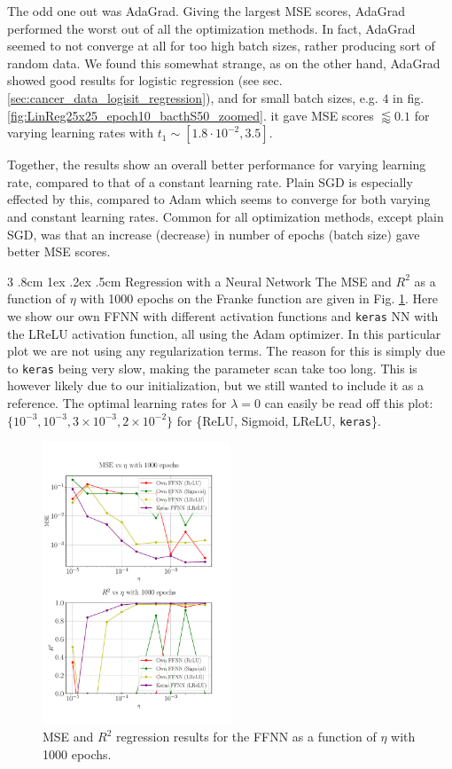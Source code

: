 \documentclass[%
reprint,s
amsmath,amssymb,
aps,
]{revtex4-2}
\makeatletter
\renewcommand{\subsubsection}{%
	\@startsection
	{subsubsection}%
	{3}%
	{\z@}%
	{.8cm \@plus1ex \@minus .2ex}%
	{.5cm}%
	{\normalfont\small\centering}%
}
\makeatother
\begin{document}
The odd one out was AdaGrad. Giving the largest MSE scores, AdaGrad performed the worst out of all the optimization methods. In fact, AdaGrad seemed to not converge at all for too high batch sizes, rather producing sort of random data. We found this somewhat strange, as on the other hand, AdaGrad showed good results for logistic regression (see sec. \ref{sec:cancer_data_logisit_regression}), and for small batch sizes, e.g. \(4\) in fig. \ref{fig:LinReg25x25_epoch10_bacthS50_zoomed}. it gave MSE scores \(\lessapprox 0.1\) for varying learning rates with \(t_1\sim[1.8\cdot 10^{-2}, 3.5]\).

Together, the results show an overall better performance for varying learning rate, compared to that of a constant learning rate. Plain SGD is especially effected by this, compared to Adam which seems to converge for both varying and constant learning rates. Common for all optimization methods, except plain SGD, was that an increase (decrease) in number of epochs (batch size) gave better MSE scores.

\subsubsection{Regression with a Neural Network}
The MSE and $R^2$ as a function of $\eta$ with 1000 epochs on the Franke function are given in Fig. \ref{fig:NN_Franke_LR_1000}. Here we show our own FFNN with different activation functions and \texttt{keras} NN with the LReLU activation function, all using the Adam optimizer. In this particular plot we are not using any regularization terms. The reason for this is simply due to \texttt{keras} being very slow, making the parameter scan take too long. This is however likely due to our initialization, but we still wanted to include it as a reference. The optimal learning rates for $\lambda=0$ can easily be read off this plot: $\{10^{-3},10^{-3},3\times10^{-3},2\times 10^{-2}\}$ for \{ReLU, Sigmoid, LReLU, \texttt{keras}\}.
\begin{figure}[ht!]
	\includegraphics[width=0.5\textwidth]{Figures/NN_MSE_R2_Franke_LearningRate_Epochs1000.pdf}
	\caption{MSE and $R^2$ regression results for the FFNN as a function of $\eta$ with 1000 epochs.}
	\label{fig:NN_Franke_LR_1000}
\end{figure}
\end{document}

